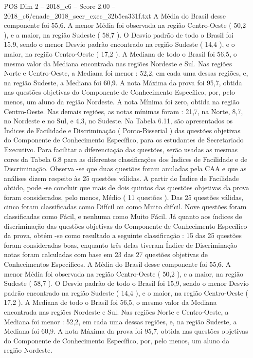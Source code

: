 \begin{textsample}{POS Dim 2 – 2018\_c6 – Score 2.00 – 2018\_c6/enade\_2018\_secr\_exec\_32b5ea331f.txt}
A Média do Brasil desse componente foi 55,6.
A menor Média foi observada na região Centro-Oeste ( 50,2 ), e a maior, na região Sudeste ( 58,7 ).
O Desvio padrão de todo o Brasil foi 15,9, sendo o menor Desvio padrão encontrado na região Sudeste ( 14,4 ), e o maior, na região Centro-Oeste ( 17,2 ).
A Mediana de todo o Brasil foi 56,5, o mesmo valor da Mediana encontrada nas regiões Nordeste e Sul.
Nas regiões Norte e Centro-Oeste, a Mediana foi menor : 52,2, em cada uma dessas regiões, e, na região Sudeste, a Mediana foi 60,9.
A nota Máxima da prova foi 95,7, obtida nas questões objetivas do Componente de Conhecimento Específico, por, pelo menos, um aluno da região Nordeste.
A nota Mínima foi zero, obtida na região Centro-Oeste.
Nas demais regiões, as notas mínimas foram : 21,7, na Norte, 8,7, no Nordeste e no Sul, e 4,3, no Sudeste.
Na Tabela 6.11, são apresentados os Índices de Facilidade e Discriminação ( Ponto-Bisserial ) das questões objetivas do Componente de Conhecimento Específico, para os estudantes de Secretariado Executivo.
Para facilitar a diferenciação das questões, serão usadas as mesmas cores da Tabela 6.8 para as diferentes classificações dos Índices de Facilidade e de Discriminação.
Observa -se que duas questões foram anuladas pela CAA e que as análises dizem respeito às 25 questões válidas.
A partir do Índice de Facilidade obtido, pode -se concluir que mais de dois quintos das questões objetivas da prova foram considerados, pelo menos, Médio ( 11 questões ).
Das 25 questões válidas, cinco foram classificadas como Difícil ou como Muito difícil.
Nove questões foram classificadas como Fácil, e nenhuma como Muito Fácil.
Já quanto aos índices de discriminação das questões objetivas do Componente de Conhecimento Específico da prova, obtém -se como resultado a seguinte classificação : 15 das 25 questões foram consideradas boas, enquanto três delas tiveram Índice de Discriminação notas foram calculadas com base em 23 das 27 questões objetivas de Conhecimentos Específicos.
A Média do Brasil desse componente foi 55,6.
A menor Média foi observada na região Centro-Oeste ( 50,2 ), e a maior, na região Sudeste ( 58,7 ).
O Desvio padrão de todo o Brasil foi 15,9, sendo o menor Desvio padrão encontrado na região Sudeste ( 14,4 ), e o maior, na região Centro-Oeste ( 17,2 ).
A Mediana de todo o Brasil foi 56,5, o mesmo valor da Mediana encontrada nas regiões Nordeste e Sul.
Nas regiões Norte e Centro-Oeste, a Mediana foi menor : 52,2, em cada uma dessas regiões, e, na região Sudeste, a Mediana foi 60,9.
A nota Máxima da prova foi 95,7, obtida nas questões objetivas do Componente de Conhecimento Específico, por, pelo menos, um aluno da região Nordeste.

\end{textsample}
